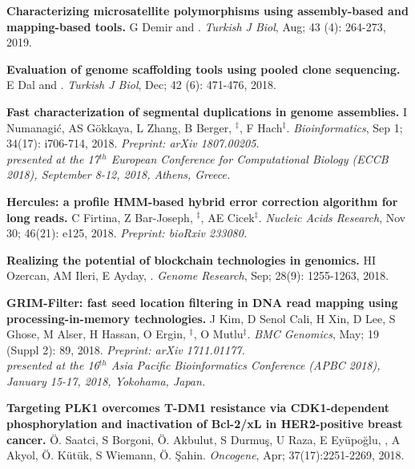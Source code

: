 \vspace{-.2cm}
    {\bf Characterizing microsatellite polymorphisms using assembly-based and mapping-based tools.}  G Demir and \calkan{}. {\em Turkish J Biol}, Aug; 43 (4): 264-273, 2019.

\vspace{-.2cm}
    {\bf Evaluation of genome scaffolding tools using pooled clone sequencing.}  E Dal and \calkan{}. {\em Turkish J Biol}, Dec; 42 (6): 471-476, 2018.
         
\vspace{-.2cm}
    {\bf Fast characterization of segmental duplications in genome assemblies.}
    I Numanagić,  AS Gökkaya, L Zhang, B Berger, \calkan{}$^\ddag$, F Hach$^\ddag$.
    {\em Bioinformatics}, Sep 1; 34(17): i706-714, 2018. \textit{Preprint: arXiv 1807.00205.}\\
    \hspace*{1cm}
    {\footnotesize \em presented at the 17$^{th}$ European Conference for Computational Biology (ECCB 2018), September 8-12, 2018, Athens, Greece.}

\vspace{-.2cm}
    {\bf Hercules: a profile HMM-based hybrid error correction algorithm for long reads.}
    C Firtina, Z Bar-Joseph, \calkan{}$^\ddag$, AE Cicek$^\ddag$.
    {\it Nucleic Acids Research}, Nov 30; 46(21): e125, 2018. \textit{Preprint: bioRxiv 233080.}
          
\vspace{-.2cm}
    {\bf Realizing the potential of blockchain technologies in genomics.}
    HI Ozercan, AM Ileri, E Ayday, \calkan{}.
    {\em Genome Research}, Sep; 28(9): 1255-1263, 2018.

\vspace{-.2cm}
    {\bf GRIM-Filter: fast seed location filtering in DNA read mapping using processing-in-memory technologies.}
    J Kim, D Senol Cali, H Xin, D Lee, S Ghose, M Alser, H Hassan, O Ergin, \calkan{}$^\ddag$, O Mutlu$^\ddag$.
    {\em BMC Genomics}, May; 19 (Suppl 2): 89, 2018. \textit{Preprint: arXiv 1711.01177.}\\
    \hspace*{1cm}
    {\footnotesize \em presented at the 16$^{th}$ Asia Pacific Bioinformatics Conference (APBC 2018), January 15-17, 2018, Yokohama, Japan.}

\clearpage

\vspace{-.2cm}        
    {\bf Targeting PLK1 overcomes T-DM1 resistance via CDK1-dependent phosphorylation and inactivation of Bcl-2/xL in HER2-positive breast cancer.}
    Ö. Saatci, S Borgoni, Ö. Akbulut, S Durmuş, U Raza, E Eyüpoğlu, \calkan{}, A Akyol, Ö. Kütük, S Wiemann, Ö. Şahin.         
    {\em Oncogene}, Apr; 37(17):2251-2269, 2018.

